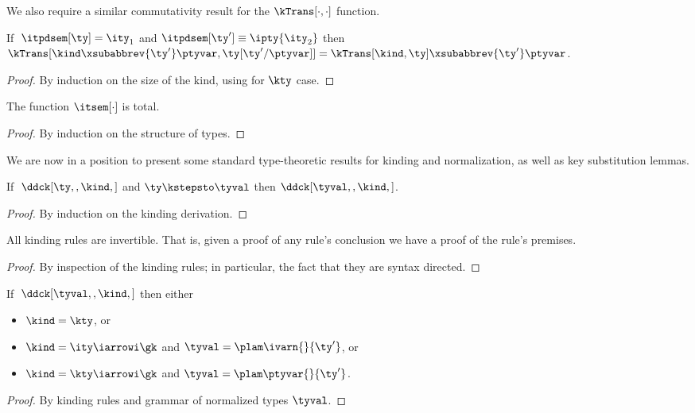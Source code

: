 We also require a similar commutativity result for the 
$\kTrans[\cdot,\cdot]$ function.
\begin{lemma}
 If $\;\itpdsem[\ty] = \ity_1$ and
    $\itpdsem[\ty'] \equiv {\ipty {\ity_2}}$
then  $\kTrans[{\kind\xsubabbrev {\ty'} \ptyvar},{\ty[\ty'/\ptyvar]}] = 
  \kTrans[\kind,\ty]\xsubabbrev {\ty'} \ptyvar$.
\label{lemma:pt-subst-comm}
\end{lemma}

\begin{proof}
  By induction on the size of the kind, using
   for $\kty$ case.
\end{proof}

\begin{lemma}
  The function $\itsem[\cdot]$ is total.
\end{lemma}
\begin{proof}
  By induction on the structure of types.
\end{proof}

We are now in a position to 
present some standard type-theoretic results for \ddc{}
kinding and normalization, as well as key substitution lemmas.

\begin{lemma}
  If $\; \ddck[\ty,,\kind,]$ and $\ty \kstepsto \tyval$ then $\ddck[\tyval,,\kind,]$.
\label{lemma:ddc-preservation}
\end{lemma}
\begin{proof}
  By induction on the kinding derivation.
\end{proof}

\begin{lemma}
  All kinding rules are invertible. That is, given a proof of any rule's conclusion we have a proof of the rule's premises.
  \label{lemma:inversion}
\end{lemma}
\begin{proof}
  By inspection of the kinding rules; in particular, the fact that they are syntax directed.
\end{proof}

\begin{lemma}
  If $\; \ddck[\tyval,,\kind,]$ then either
  \begin{itemize}
  \item $\kind = \kty$, or
  \item $\kind = \ity \iarrowi \gk$ and $\tyval = \plam \ivarn {} {\ty'}$, or
  \item $\kind = \kty \iarrowi \gk$ and $\tyval = \plam \ptyvar {} {\ty'}$.
  \end{itemize}
\label{lemma:norm-canon-form}
\end{lemma}
\begin{proof}
  By kinding rules and grammar of normalized types $\tyval$.
\end{proof}

